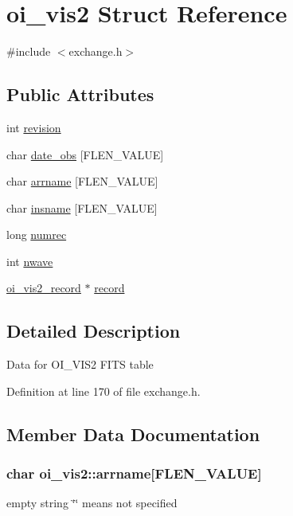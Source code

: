 \hypertarget{structoi__vis2}{
\section{oi\_\-vis2 Struct Reference}
\label{structoi__vis2}
}


{\ttfamily \#include $<$exchange.h$>$}

\subsection*{Public Attributes}
\begin{DoxyCompactItemize}
\item 
int \hyperlink{structoi__vis2_a6086c7ebeff02b008f21f4354f98962b}{revision}
\item 
char \hyperlink{structoi__vis2_ad8a5862de3445b02015b25500da07f79}{date\_\-obs} \mbox{[}FLEN\_\-VALUE\mbox{]}
\item 
char \hyperlink{structoi__vis2_a67db065288bd6e891ad3c98dbb7ae272}{arrname} \mbox{[}FLEN\_\-VALUE\mbox{]}
\item 
char \hyperlink{structoi__vis2_af4fc16aa8199ad4c95012012fcdd836c}{insname} \mbox{[}FLEN\_\-VALUE\mbox{]}
\item 
long \hyperlink{structoi__vis2_a4995c2d065c5ad1dddb5f59eebec14af}{numrec}
\item 
int \hyperlink{structoi__vis2_a3069b43b95ce6d4877902a0095213461}{nwave}
\item 
\hyperlink{structoi__vis2__record}{oi\_\-vis2\_\-record} $\ast$ \hyperlink{structoi__vis2_a81c8fc75ea58572ee3df3488f9ee2086}{record}
\end{DoxyCompactItemize}


\subsection{Detailed Description}
Data for OI\_\-VIS2 FITS table 

Definition at line 170 of file exchange.h.



\subsection{Member Data Documentation}
\hypertarget{structoi__vis2_a67db065288bd6e891ad3c98dbb7ae272}{
\subsubsection[{arrname}]{\setlength{\rightskip}{0pt plus 5cm}char {\bf oi\_\-vis2::arrname}\mbox{[}FLEN\_\-VALUE\mbox{]}}}
\label{structoi__vis2_a67db065288bd6e891ad3c98dbb7ae272}
empty string \char`\"{}\char`\"{} means not specified 

